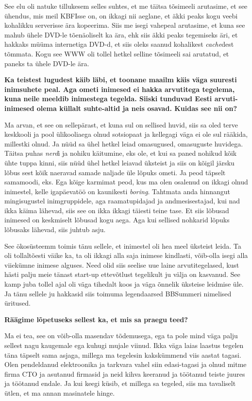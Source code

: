 See elu oli natuke tillukesem selles suhtes, et me täitsa tõsimeeli arutasime, et see ühendus, mis meil KBFIsse on, on ikkagi nii aeglane, et äkki peaks kogu veebi kohalikku serverisse ära kopeerima. Siis me isegi vahepeal arutasime, et kuna see mahub ühele DVD-le tõenäoliselt ka ära, ehk siis äkki peaks tegemiseks äri, et hakkaks müüma internetiga DVD-d, et siis oleks saanud kohalikest \emph{cache}dest tõmmata. Kogu see WWW oli tollel hetkel selline tõsimeeli sai arutatud, et paneks ta  ühele DVD-le ära. 

\textbf{Ka teistest lugudest käib läbi, et toonane maailm käis väga suuresti inimsuhete peal. Aga ometi inimesed ei hakka arvutitega tegelema, kuna neile meeldib inimestega tegelda. Siiski tunduvad Eesti arvuti-inimesed olema küllalt suhte-altid ja neis osavad. Kuidas see nii on?}

Ma arvan, et see on sellepärast, et kuna sul on sellised huvid, siis sa oled terve keskkooli ja pool ülikooliaega olnud sotsiopaat ja kellegagi väga ei ole sul rääkida, millestki olnud. Ja nüüd sa ühel hetkel leiad omasugused, omasuguste huvidega. Täitsa puhas \emph{nerd}i ja nohiku käitumine, eks ole, et kui sa paned  nohikud  kõik ühte tuppa kinni, siis nüüd ühel hetkel leiavad üksteist ja siis on kõigil järsku lõbus sest kõik naeravad samade naljade üle lõpuks ometi. Ja peod täpselt samamoodi, eks. Ega kõige karmimat peod, kus ma olen  osalenud on ikkagi olnud inimestel, kelle igapäevatöö on kaunikesti \emph{boring}. Tahtmata anda hinnangut mingisugustel inimgruppidele, aga   raamatupidajad ja  andmesisestajad, kui nad ikka käima lähevad, siis see on ikka ikkagi täiesti teine tase. Et siis lõbusad inimesed on keskmiselt lõbusad kogu aega. Aga kui sellised nohkarid lõpuks lõbusaks lähevad, siis juhtub asju.

See ökosüsteemm toimis tänu sellele, et inimestel oli hea meel üksteist leida. Ta oli tollaltõesti väike ka, ta oli ikkagi alla saja inimese kindlasti,  võib-olla isegi alla viiekümne inimese alguses. Need olid siis seelise uue laine  arvutitegelased, kust hästi palju meie tänast  start-up ettevõtlust tegelikult ju välja on kasvanud. See kamp juba tollel ajal oli väga tihedalt koos ja väga õnnelik üksteise leidmise üle. Ja tänu sellele ju hakkasid siis toimuma legendaarsed BBSummeri nimelised üritused. 

\textbf{Räägime lõpetuseks sellest ka, et mis sa praegu teed?}

Ma ei tea, see on võib-olla masendav tõdemusega, ega ta pole mind väga palju sellest nagu kaugemale ega kuhugi mujale viinud. Ikka väga laias laastus tegelen täna täpselt sama asjaga, millega ma tegelesin kakskümmend viis aastat tagasi. Olen pendeldanud elektroonika ja tarkvara vahel siin edasi-tagasi ja olnud mitme firma CTO ja  asutanud firmasid ja neid kihva keeranud ja töötanud teiste juures ja töötanud endale. Ja kui keegi küsib, et millega sa tegeled, siis ma tavaliselt ütlen, et ma annan masinatele hinge. 


